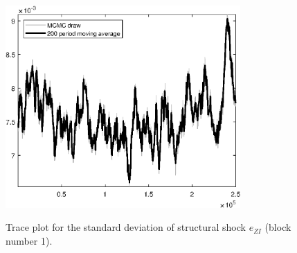 \begin{figure}[H]
\centering
  \includegraphics[width=0.8\textwidth]{BRS_imp_mobility/graphs/TracePlot_SE_e_ZI_blck_1}\\
    \caption{Trace plot for the standard deviation of structural shock ${e_{ZI}}$ (block number 1).}
\end{figure}
